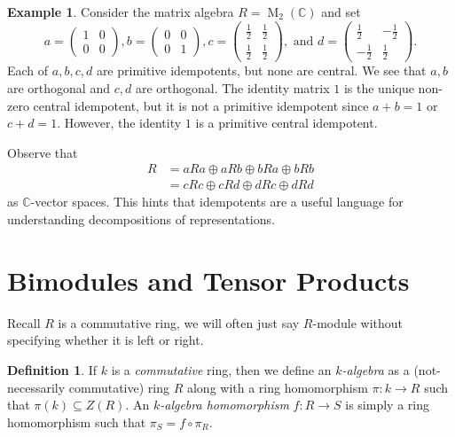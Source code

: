 \documentclass[12pt]{article}
\theoremstyle{plain}
\theoremstyle{definition}
\newtheorem{definition}[theorem]{Definition}
\newtheorem{example}[theorem]{Example}
\theoremstyle{remark}
\numberwithin{equation}{section}
\begin{document}
\begin{example}
Consider the matrix algebra $R=\operatorname{M}_2(\mathbb{C})$
and set
\[
a = \begin{pmatrix} 1 & 0 \\ 0 & 0 \end{pmatrix},
b = \begin{pmatrix} 0 & 0 \\ 0 & 1 \end{pmatrix},
c = \begin{pmatrix} \frac{1}{2} & \frac{1}{2} \\ \frac{1}{2} & \frac{1}{2} \end{pmatrix},
\textrm{ and }
d = \begin{pmatrix} \frac{1}{2} & -\frac{1}{2} \\ -\frac{1}{2} &
\frac{1}{2} \end{pmatrix}.
\]
Each of $a,b,c,d$ are primitive idempotents, but none are central.
We see that $a,b$ are orthogonal and $c,d$ are orthogonal.
The identity matrix $1$ is the unique non-zero central idempotent,
but it is not a primitive idempotent since $a+b=1$ or $c+d=1$.
However, the identity $1$ is a primitive central idempotent.

Observe that
\begin{align*}
R &= aRa \oplus aRb \oplus bRa \oplus bRb\\
&= cRc \oplus cRd \oplus dRc \oplus dRd
\end{align*}
as $\mathbb{C}$-vector spaces.
This hints that idempotents are a useful
language for understanding decompositions of representations.
\end{example}

\section{Bimodules and Tensor Products}

Recall $R$ is a commutative ring, we will often just say $R$-module without
specifying whether it is left or right.

\begin{definition}
If $k$ is a \emph{commutative} ring, then we define an
\emph{$k$-algebra} as a (not-necessarily commutative) ring $R$ along
with a ring homomorphism $\pi : k \to R$ such that $\pi(k) \subseteq Z(R)$.
An \emph{$k$-algebra homomorphism} $f : R \to S$ is simply a ring
homomorphism such that $\pi_S = f \circ \pi_R$.
\end{definition}
\end{document}
